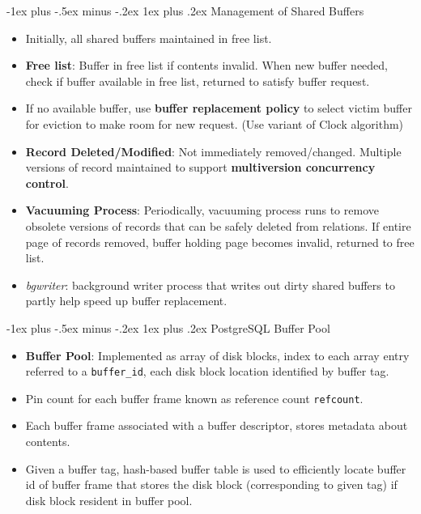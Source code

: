 \documentclass[10pt, landscape]{article}
\makeatletter
\renewcommand{\subsubsection}{\@startsection{subsubsection}{3}{0mm}%
                                {-1ex plus -.5ex minus -.2ex}%
                                {1ex plus .2ex}%
                                {\normalfont\small\bfseries}}
\newcommand{\code}[1]{\colorbox{gray!25!}{\lstinline|#1|}}
\makeatother
\begin{document}
\begin{multicols*}{3}
\subsubsection{Management of Shared Buffers}
\begin{itemize}
\item Initially, all shared buffers maintained in free list.
\item \textbf{Free list}: Buffer in free list if contents invalid. When new buffer needed, check if buffer available in free list, returned to satisfy buffer request.
\item If no available buffer, use \textbf{buffer replacement policy} to select victim buffer for eviction to make room for new request. (Use variant of Clock algorithm)

\item \textbf{Record Deleted/Modified}: Not immediately removed/changed. Multiple versions of record maintained to support \textbf{multiversion concurrency control}.
\item \textbf{Vacuuming Process}: Periodically, vacuuming process runs to remove obsolete versions of records that can be safely deleted from relations. If entire page of records removed, buffer holding page becomes invalid, returned to free list.
\item \textit{bgwriter}: background writer process that writes out dirty shared buffers to partly help speed up buffer replacement.
\end{itemize}

\subsubsection{PostgreSQL Buffer Pool}
\begin{itemize}
\item \textbf{Buffer Pool}: Implemented as array of disk blocks, index to each array entry referred to a \code{buffer_id}, each disk block location identified by buffer tag.
\item Pin count for each buffer frame known as reference count \code{refcount}.
\item Each buffer frame associated with a buffer descriptor, stores metadata about contents.
\item Given a buffer tag, hash-based buffer table is used to efficiently locate buffer id of buffer frame that stores the disk block (corresponding to given tag) if disk block resident in buffer pool.
\end{itemize}


\end{multicols*}
\end{document}
